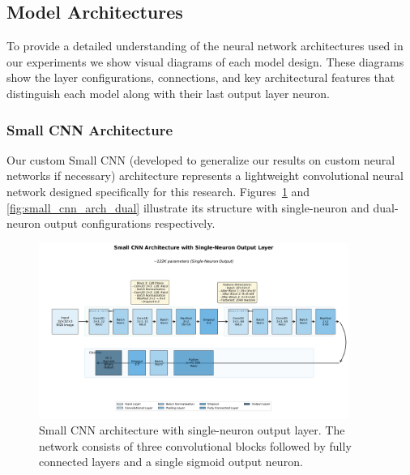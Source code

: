 \subsection{Model Architectures}

To provide a detailed understanding of the neural network architectures used in our experiments we show visual diagrams of each model design. These diagrams show the layer configurations, connections, and key architectural features that distinguish each model along with their last output layer neuron.

\subsubsection{Small CNN Architecture}

Our custom Small CNN (developed to generalize our results on custom neural networks if necessary) architecture represents a lightweight convolutional neural network designed specifically for this research. Figures~\ref{fig:small_cnn_arch_single} and \ref{fig:small_cnn_arch_dual} illustrate its structure with single-neuron and dual-neuron output configurations respectively.

\begin{figure}[!htbp]
\centering
\includegraphics[width=0.9\textwidth]{figures/small_cnn_1neuron_architecture.png}
\caption{Small CNN architecture with single-neuron output layer. The network consists of three convolutional blocks followed by fully connected layers and a single sigmoid output neuron.}
\label{fig:small_cnn_arch_single}
\end{figure}

